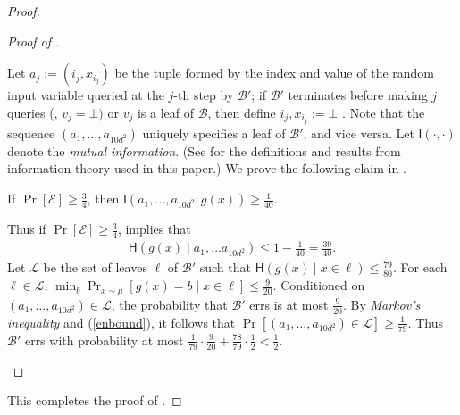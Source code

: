 \documentclass{toc}
\newcommand{\clB}{\mathcal{B}}
\newcommand{\clE}{\mathcal{E}}
\newcommand{\clL}{\mathcal{L}}
\newcommand{\I}{\mathsf{I}}
\newcommand{\Hen}{\mathsf{H}}
\begin{document}
\begin{proof}
\begin{proof}[Proof of {}]
\begin{description}
  Let $a_j:=(i_j, x_{i_j})$ be the tuple formed by the index and value of the random input variable queried at the $j$-th step by $\clB'$; if $\clB'$ terminates before making $j$ queries (\ie, $v_j = \bot)$ or $v_j$ is a leaf of $\clB$, then define $i_j, x_{i_j}:=\bot$ . Note that the sequence $(a_1, \ldots, a_{10d^2})$ uniquely specifies a leaf of $\clB'$, and vice versa. Let $\I(\cdot, \cdot)$ denote the \emph{mutual information}. (See  for the definitions and results from information theory used in this %
paper.)
We prove the following claim in .
\begin{claim}
\label{keyinf}
If $\Pr[\clE] \geq \frac{3}{4}$, then $\I(a_1, \ldots, a_{10d^2}:g(x)) \geq \frac{1}{40}$.
\end{claim}
Thus if $\Pr[\clE] \geq \frac{3}{4}$,  implies that
\begin{align}
\Hen(g(x) \mid a_1, \ldots a_{10d^2}) \leq 1-\frac{1}{40}=\frac{39}{40}. \label{enbound}
\end{align}
Let $\clL$ be the set of leaves $\ell$ of $\clB'$ such that $\Hen(g(x) \mid x \in \ell) \leq \frac{79}{80}$. For each $\ell \in \clL$, $\min_b \Pr_{x \sim \mu}[g(x)=b \mid x \in \ell] \leq \frac{9}{20}$. Conditioned on $(a_1, \ldots, a_{10d^2}) \in \clL$, the probability that $\clB'$ errs is at most $\frac{9}{20}$. By \emph{Markov's inequality} and (\ref{enbound}), it follows that $\Pr[(a_1, \ldots, a_{10d^2}) \in \clL] \geq \frac{1}{79}$. Thus $\clB'$ errs with probability at most $\frac{1}{79}\cdot \frac{9}{20}+\frac{78}{79}\cdot \frac{1}{2}<\frac{1}{2}$.
\end{description}
\end{proof}
This completes the proof of .
\end{proof}
\end{document}

